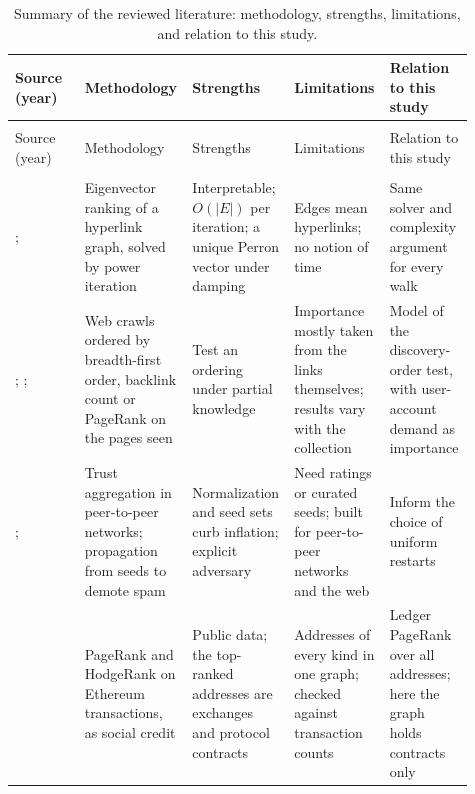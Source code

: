 {\footnotesize{}\renewcommand{\arraystretch}{1.3}%
\setlength{\tabcolsep}{4pt}
\begin{longtable}{>{\raggedright\arraybackslash}p{0.15\linewidth}>{\raggedright\arraybackslash}p{0.20\linewidth}>{\raggedright\arraybackslash}p{0.19\linewidth}>{\raggedright\arraybackslash}p{0.19\linewidth}>{\raggedright\arraybackslash}p{0.18\linewidth}}
\caption{Summary of the reviewed literature: methodology, strengths, limitations, and relation to this study.}
\label{tab:literature-summary}\\
\toprule
Source (year) & Methodology & Strengths & Limitations & Relation to this study \\
\midrule
\endfirsthead
\multicolumn{5}{l}{\small Table~\thetable\ (continued)}\\
\toprule
Source (year) & Methodology & Strengths & Limitations & Relation to this study \\
\midrule
\endhead
\midrule
\multicolumn{5}{r}{\small continued on next page}\\
\endfoot
\bottomrule
\endlastfoot
\textcite{page1999pagerank}; \textcite{langville2006pagerank} & Eigenvector ranking of a hyperlink graph, solved by power iteration & Interpretable; $O(|E|)$ per iteration; a unique Perron vector under damping & Edges mean hyperlinks; no notion of time & Same solver and complexity argument for every walk \\
\textcite{cho1998crawling}; \textcite{najork2001breadth}; \textcite{baezayates2005crawling} & Web crawls ordered by breadth-first order, backlink count or PageRank on the pages seen & Test an ordering under partial knowledge & Importance mostly taken from the links themselves; results vary with the collection & Model of the discovery-order test, with user-account demand as importance \\
\textcite{kamvar2003eigentrust}; \textcite{gyongyi2004trustrank} & Trust aggregation in peer-to-peer networks; propagation from seeds to demote spam & Normalization and seed sets curb inflation; explicit adversary & Need ratings or curated seeds; built for peer-to-peer networks and the web & Inform the choice of uniform restarts \\
\textcite{do2023hodgerank} & PageRank and HodgeRank on Ethereum transactions, as social credit & Public data; the top-ranked addresses are exchanges and protocol contracts & Addresses of every kind in one graph; checked against transaction counts & Ledger PageRank over all addresses; here the graph holds contracts only \\

\end{longtable}}
